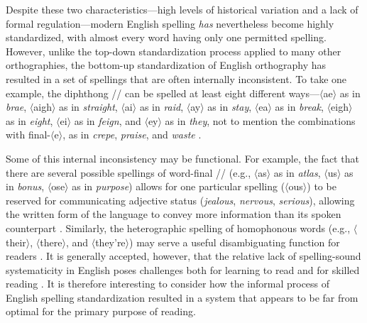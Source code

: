 \documentclass[doc,biblatex]{apa7}
\newcommand\spelling[1]{\allowbreak$\langle$#1$\rangle$}
\newcommand\pronunciation[1]{/\textdoulos{#1}/}
\begin{document}
Despite these two characteristics---high levels of historical variation and a lack of formal regulation---modern English spelling \textit{has} nevertheless become highly standardized, with almost every word having only one permitted spelling. However, unlike the top-down standardization process applied to many other orthographies, the bottom-up standardization of English orthography has resulted in a set of spellings that are often internally inconsistent. To take one example, the diphthong \pronunciation{eɪ} can be spelled at least eight different ways---\spelling{ae} as in \textit{brae}, \spelling{aigh} as in \textit{straight}, \spelling{ai} as in \textit{raid}, \spelling{ay} as in \textit{stay}, \spelling{ea} as in \textit{break}, \spelling{eigh} as in \textit{eight}, \spelling{ei} as in \textit{feign}, and \spelling{ey} as in \textit{they}, not to mention the combinations with final-\spelling{e}, as in \textit{crepe}, \textit{praise}, and \textit{waste} \parencite{Rastle:2002}.

Some of this internal inconsistency may be functional. For example, the fact that there are several possible spellings of word-final \pronunciation{əs} (e.g., \spelling{as} as in \textit{atlas}, \spelling{us} as in \textit{bonus}, \spelling{ose} as in \textit{purpose}) allows for one particular spelling (\spelling{ous}) to be reserved for communicating adjective status (\textit{jealous}, \textit{nervous}, \textit{serious}), allowing the written form of the language to convey more information than its spoken counterpart \parencite{Berg:2017, Rastle:2019, Ulicheva:2020}. Similarly, the heterographic spelling of homophonous words (e.g., \spelling{their}, \spelling{there}, and \spelling{they're}) may serve a useful disambiguating function for readers \parencite{CarrRastle:2024}. It is generally accepted, however, that the relative lack of spelling-sound systematicity in English poses challenges both for learning to read \parencite{Seymour:2003} and for skilled reading \parencite{Glushko:1979}. It is therefore interesting to consider how the informal process of English spelling standardization resulted in a system that appears to be far from optimal for the primary purpose of reading.
\end{document}
